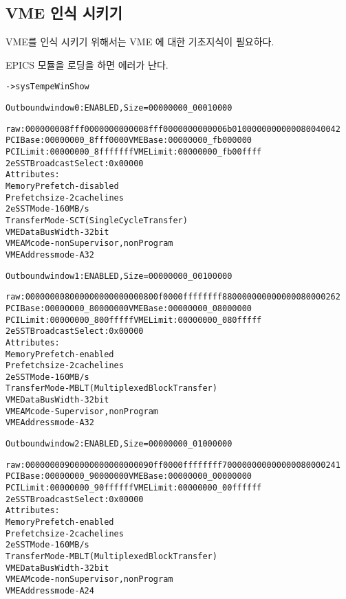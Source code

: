 \documentclass[11pt,a4paper]{article}
\begin{document}
\subsection{VME 인식 시키기}
VME를 인식 시키기 위해서는 VME 에 대한 기초지식이 필요하다. 

EPICS 모듈을 로딩을 하면 에러가 난다.
\begin{framed}
\begin{alltt}
-> sysTempeWinShow

Outbound window 0: ENABLED,  Size = 00000000_00010000

raw: 00000000 8fff0000 00000000 8fff0000 00000000 6b010000 00000000 80040042
PCI Base:  00000000_8fff0000    VME Base:  00000000_fb000000
PCI Limit: 00000000_8fffffff    VME Limit: 00000000_fb00ffff
     2eSST Broadcast Select: 0x00000
     Attributes:
        Memory Prefetch      - disabled
        Prefetch size        - 2 cache lines
        2eSST Mode           - 160 MB/s
        Transfer Mode        - SCT (Single Cycle Transfer)
        VME Data Bus Width   - 32 bit
        VME AM code          - nonSupervisor, nonProgram
        VME Address mode     - A32


Outbound window 1: ENABLED,  Size = 00000000_00100000

raw: 00000000 80000000 00000000 800f0000 ffffffff 88000000 00000000 80000262
PCI Base:  00000000_80000000    VME Base:  00000000_08000000
PCI Limit: 00000000_800fffff    VME Limit: 00000000_080fffff
     2eSST Broadcast Select: 0x00000
     Attributes:
        Memory Prefetch      - enabled
        Prefetch size        - 2 cache lines
        2eSST Mode           - 160 MB/s
        Transfer Mode        - MBLT (Multiplexed Block Transfer)
        VME Data Bus Width   - 32 bit
        VME AM code          - Supervisor, nonProgram
        VME Address mode     - A32


Outbound window 2: ENABLED,  Size = 00000000_01000000

raw: 00000000 90000000 00000000 90ff0000 ffffffff 70000000 00000000 80000241
PCI Base:  00000000_90000000    VME Base:  00000000_00000000
PCI Limit: 00000000_90ffffff    VME Limit: 00000000_00ffffff
     2eSST Broadcast Select: 0x00000
     Attributes:
        Memory Prefetch      - enabled
        Prefetch size        - 2 cache lines
        2eSST Mode           - 160 MB/s
        Transfer Mode        - MBLT (Multiplexed Block Transfer)
        VME Data Bus Width   - 32 bit
        VME AM code          - nonSupervisor, nonProgram
        VME Address mode     - A24



\end{alltt}
\end{framed}
\end{document}
